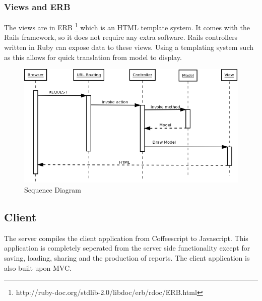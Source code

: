 \documentclass{report}
\begin{document}
				\subsubsection{Views and ERB} 
					The views are in ERB \footnote{http://ruby-doc.org/stdlib-2.0/libdoc/erb/rdoc/ERB.html} which is an HTML template system. It comes with the Rails framework, so it does not require any extra software. Rails controllers written in Ruby can expose data to these views. Using a templating system such as this allows for quick translation from model to display. 
			\clearpage
			\begin{figure}[htb]
				\begin{center}
				\includegraphics[width=\linewidth]{SequenceDiagramLife.png}
				\caption{Sequence Diagram}
				\label{fig: SequenceDiagram}
				\end{center}
				\end{figure}	
			\clearpage

			\subsection{Client}
				The server compiles the client application from Coffeescript to Javascript. This application is completely seperated from the server side functionality except for saving, loading, sharing and the production of reports. The client application is also built upon MVC.\\	
				
\end{document}
